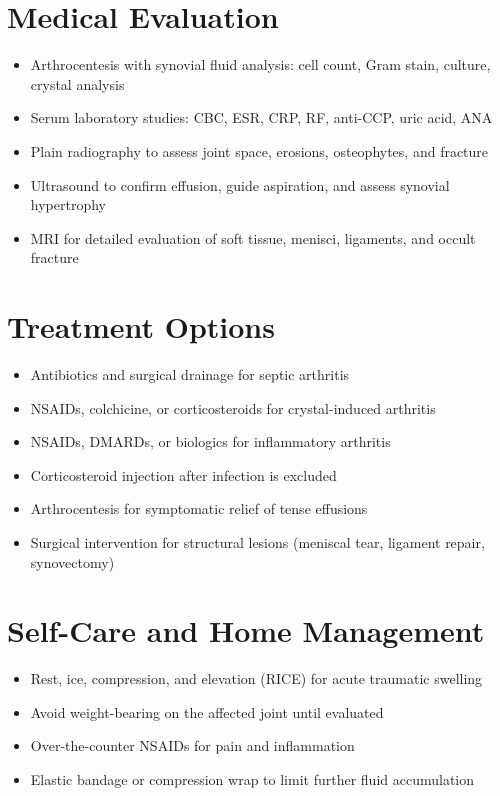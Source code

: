 \section*{Medical Evaluation}
\begin{itemize}
  \item Arthrocentesis with synovial fluid analysis: cell count, Gram stain, culture, crystal analysis
  \item Serum laboratory studies: CBC, ESR, CRP, RF, anti-CCP, uric acid, ANA
  \item Plain radiography to assess joint space, erosions, osteophytes, and fracture
  \item Ultrasound to confirm effusion, guide aspiration, and assess synovial hypertrophy
  \item MRI for detailed evaluation of soft tissue, menisci, ligaments, and occult fracture
\end{itemize}

\section*{Treatment Options}
\begin{itemize}
  \item Antibiotics and surgical drainage for septic arthritis
  \item NSAIDs, colchicine, or corticosteroids for crystal-induced arthritis
  \item NSAIDs, DMARDs, or biologics for inflammatory arthritis
  \item Corticosteroid injection after infection is excluded
  \item Arthrocentesis for symptomatic relief of tense effusions
  \item Surgical intervention for structural lesions (meniscal tear, ligament repair, synovectomy)
\end{itemize}

\section*{Self-Care and Home Management}
\begin{itemize}
  \item Rest, ice, compression, and elevation (RICE) for acute traumatic swelling
  \item Avoid weight-bearing on the affected joint until evaluated
  \item Over-the-counter NSAIDs for pain and inflammation
  \item Elastic bandage or compression wrap to limit further fluid accumulation
\end{itemize}

